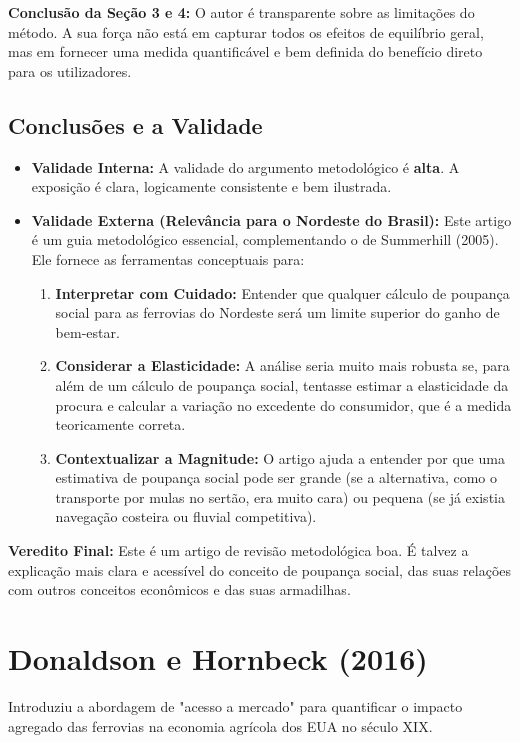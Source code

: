 \documentclass[12pt, a4paper]{article}
\begin{document}
\noindent\textbf{Conclusão da Seção 3 e 4:} O autor é transparente sobre as limitações do método. A sua força não está em capturar todos os efeitos de equilíbrio geral, mas em fornecer uma medida quantificável e bem definida do benefício direto para os utilizadores.

\subsection{Conclusões e a Validade}
\begin{itemize}
    \item \textbf{Validade Interna:} A validade do argumento metodológico é \textbf{alta}. A exposição é clara, logicamente consistente e bem ilustrada.
    \item \textbf{Validade Externa (Relevância para o Nordeste do Brasil):} Este artigo é um guia metodológico essencial, complementando o de Summerhill (2005). Ele fornece as ferramentas conceptuais para:
        \begin{enumerate}
            \item \textbf{Interpretar com Cuidado:} Entender que qualquer cálculo de poupança social para as ferrovias do Nordeste será um limite superior do ganho de bem-estar.
            \item \textbf{Considerar a Elasticidade:} A análise seria muito mais robusta se, para além de um cálculo de poupança social, tentasse estimar a elasticidade da procura e calcular a variação no excedente do consumidor, que é a medida teoricamente correta.
            \item \textbf{Contextualizar a Magnitude:} O artigo ajuda a entender por que uma estimativa de poupança social pode ser grande (se a alternativa, como o transporte por mulas no sertão, era muito cara) ou pequena (se já existia navegação costeira ou fluvial competitiva).
        \end{enumerate}
\end{itemize}

\noindent\textbf{Veredito Final:} Este é um artigo de revisão metodológica boa. É talvez a explicação mais clara e acessível do conceito de poupança social, das suas relações com outros conceitos econômicos e das suas armadilhas. 

\section{Donaldson e Hornbeck (2016)}
Introduziu a abordagem de "acesso a mercado" para quantificar o impacto agregado das ferrovias na economia agrícola dos EUA no século XIX.
\end{document}
